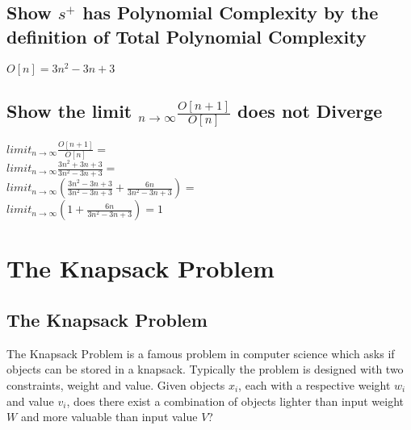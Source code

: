 \documentclass[11pt]{article}
\begin{document}
\subsection{Show $s^+$ has Polynomial Complexity by the definition of Total Polynomial Complexity}
\begin{center}
\vspace{2mm}
$
O[n] = 3n^2 -3n + 3
$
\end{center}

\subsection{Show the limit $_{n \rightarrow \infty}\frac{O[n+1]}{O[n]}$ does not Diverge}
\begin{center}
$
limit_{n \rightarrow \infty}\frac{O[n+1]}{O[n]} =
$
\\ \vspace{2mm}
$
limit_{n \rightarrow \infty}\frac{3n^2 + 3n + 3}{3n^2 - 3n + 3} =
$
\\ \vspace{2mm}
$
limit_{n \rightarrow \infty}(\frac{3n^2 - 3n + 3}{3n^2 - 3n + 3} + \frac{6n}{3n^2 - 3n + 3}) =
$
\\ \vspace{2mm}
$
limit_{n \rightarrow \infty}(1 + \frac{6n }{3n^2 - 3n + 3}) = 1
$
\end{center}





\newpage
\section{The Knapsack Problem}


\subsection{The Knapsack Problem}
The Knapsack Problem is a famous problem in computer science which asks if objects can be stored in a knapsack. Typically the problem is designed
with two constraints, weight and value. Given objects $x_i$, each with a respective weight $w_i$ and value $v_i$, does there exist a combination of
objects lighter than input weight $W$ and more valuable than input value $V$?


\end{document}

